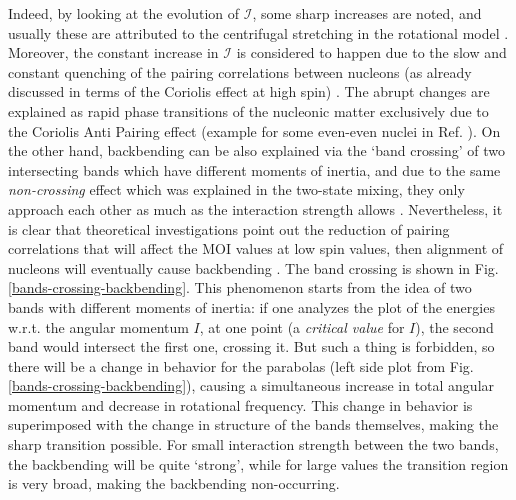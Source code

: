 Indeed, by looking at the evolution of $\mathcal{I}$, some sharp increases are noted, and usually these are attributed to the centrifugal stretching in the rotational model \cite{davydov1960rotation}. Moreover, the constant increase in $\mathcal{I}$ is considered to happen due to the slow and constant quenching of the pairing correlations between nucleons (as already discussed in terms of the Coriolis effect at high spin) \cite{mottelson1960effect}. The abrupt changes are explained as rapid phase transitions of the nucleonic matter \cite{krumlinde1974effect} exclusively due to the Coriolis Anti Pairing effect (example for some even-even nuclei in Ref. \cite{raduta2011semimicroscopic}). 
On the other hand, backbending can be also explained via the `band crossing' of two intersecting bands which have different moments of inertia, and due to the same \emph{non-crossing} effect which was explained in the two-state mixing, they only approach each other as much as the interaction strength allows \cite{ring2004nuclear}. Nevertheless, it is clear that theoretical investigations point out the reduction of pairing correlations that will affect the MOI values at low spin values, then alignment of nucleons will eventually cause backbending \cite{Stephens1974BackbendingAR,Stephens1972CoriolisEI}. 
The band crossing is shown in Fig. \ref{bands-crossing-backbending}. This phenomenon starts from the idea of two bands with different moments of inertia: if one analyzes the plot of the energies w.r.t. the angular momentum $I$, at one point (a \emph{critical value} for $I$), the second band would intersect the first one, crossing it. But such a thing is forbidden, so there will be a change in behavior for the parabolas (left side plot from Fig. \ref{bands-crossing-backbending}), causing a simultaneous increase in total angular momentum and decrease in rotational frequency. This change in behavior is superimposed with the change in structure of the bands themselves, making the sharp transition possible. For small interaction strength between the two bands, the backbending will be quite `strong', while for large values the transition region is very broad, making the backbending non-occurring.


